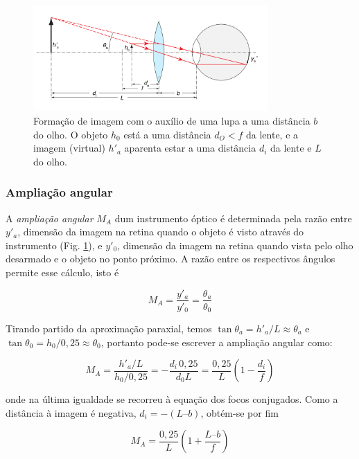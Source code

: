 \documentclass[12pt,a4paper,oneside]{paper}
\begin{document}
\begin{figure}[H]
	\centering 
	\includegraphics[width=0.8\textwidth]{./otica_images/olho-5}
	\caption{Formação de imagem com o auxílio de uma lupa a uma distância $b$ do olho. O objeto $h_0$ está a uma distância
    $d_O<f$ da lente, e a imagem (virtual) $h'_a$ aparenta estar a uma distância $d_i$ da lente e $L$ do olho. \label{fig:olho-5}} 
\end{figure}

\subsubsection{ \sf Ampliação angular}

A \emph{ampliação angular} $M_A$ dum instrumento óptico é determinada pela razão entre $y'_a$, dimensão da imagem na retina
quando o objeto é visto através do instrumento (Fig. \ref{fig:olho-5}), e $y'_0$, dimensão da imagem na retina quando vista
pelo olho desarmado e o objeto no ponto próximo. A razão entre os respectivos ângulos permite esse cálculo, isto é 

\begin{equation}
M_A=\frac{y'_a}{y'_0}=\frac{\theta_a}{\theta_0}
\end{equation}

Tirando partido da aproximação paraxial, temos $\tan\theta_a = h'_a / L \approx \theta_a$ e $\tan\theta_0 = h_0 / 0,25 \approx\theta_0$, portanto pode-se escrever a ampliação angular como:

\begin{equation}
M_A = \frac{h'_a/L}{h_0/0,25}=-\frac{d_i\,0,25}{d_0 L}= \frac{0,25}{L}\left(1-\frac{d_i}{f}\right) 
\end{equation}

onde na última igualdade se recorreu à equação dos focos conjugados. Como a distância à imagem é negativa, $d_i = - (L – b)$,
obtém-se por fim

\begin{equation}
M_A = \frac{0,25}{L}\left(1+\frac{L–b}{f}\right)
\end{equation}
\end{document}
